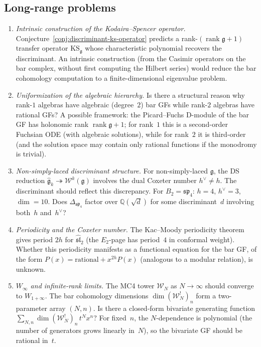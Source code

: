 \subsection{Long-range problems}

\begin{enumerate}[label=\textbf{LR-\arabic*.}, leftmargin=3em]
\item \emph{Intrinsic construction of the Kodaira--Spencer operator.}
Conjecture~\ref{conj:discriminant-ks-operator} predicts a rank-$(\operatorname{rank}\mathfrak{g}+1)$ transfer operator $\mathrm{KS}_{\mathfrak{g}}$ whose characteristic polynomial recovers the discriminant. An intrinsic construction (from the Casimir operators on the bar complex, without first computing the Hilbert series) would reduce the bar cohomology computation to a finite-dimensional eigenvalue problem.

\item \emph{Uniformization of the algebraic hierarchy.}
Is there a structural reason why rank-$1$ algebras have algebraic (degree~$2$) bar GFs while rank-$2$ algebras have rational GFs? A possible framework: the Picard--Fuchs D-module of the bar GF has holonomic rank $\operatorname{rank}\mathfrak{g} + 1$; for rank~$1$ this is a second-order Fuchsian ODE (with algebraic solutions), while for rank~$2$ it is third-order (and the solution space may contain only rational functions if the monodromy is trivial).

\item \emph{Non-simply-laced discriminant structure.}
For non-simply-laced $\mathfrak{g}$, the DS reduction $\widehat{\mathfrak{g}}_k \twoheadrightarrow \mathcal{W}^k(\mathfrak{g})$ involves the dual Coxeter number $h^\vee \neq h$. The discriminant should reflect this discrepancy. For $B_2 = \mathfrak{sp}_4$: $h = 4$, $h^\vee = 3$, $\dim = 10$. Does $\Delta_{\mathfrak{sp}_4}$ factor over $\mathbb{Q}(\sqrt{d})$ for some discriminant~$d$ involving both~$h$ and~$h^\vee$?

\item \emph{Periodicity and the Coxeter number.}
The Kac--Moody periodicity theorem gives period $2h$ for $\widehat{\mathfrak{sl}}_2$ (the $E_2$-page has period~$4$ in conformal weight). Whether this periodicity manifests as a functional equation for the bar GF, of the form $P(x) = \text{rational} + x^{2h} P(x)$ (analogous to a modular relation), is unknown.

\item \emph{$W_\infty$ and infinite-rank limits.}
The MC4 tower $\mathcal{W}_N$ as $N \to \infty$ should converge to $W_{1+\infty}$. The bar cohomology dimensions $\dim(\mathcal{W}_N^!)_n$ form a two-parameter array $(N, n)$. Is there a closed-form bivariate generating function $\sum_{N,n} \dim(\mathcal{W}_N^!)_n\, t^N x^n$? For fixed~$n$, the $N$-dependence is polynomial (the number of generators grows linearly in~$N$), so the bivariate GF should be rational in~$t$.
\end{enumerate}


